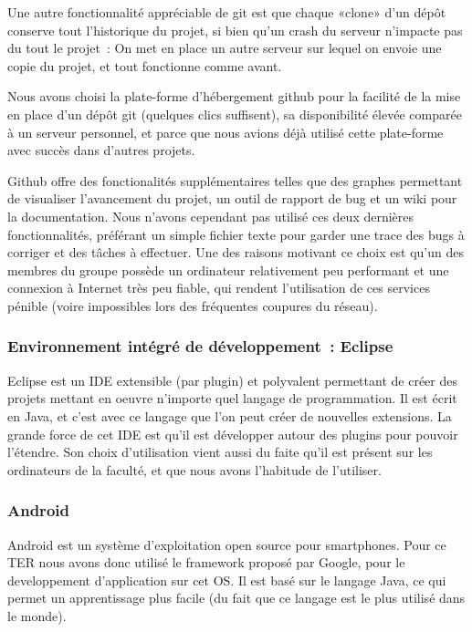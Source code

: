 \documentclass[a4paper,11pt,french]{article}
\def\android{Android\texttrademark{}}
\begin{document}
Une autre fonctionnalité appréciable de git est que chaque «clone» d'un dépôt conserve tout l'historique du projet, si bien qu'un crash du serveur n'impacte pas du tout le projet~: On met en place un autre serveur sur lequel on envoie une copie du projet, et tout fonctionne comme avant.

Nous avons choisi la plate-forme d'hébergement github pour la facilité de la mise en place d'un dépôt git (quelques clics suffisent), sa disponibilité élevée comparée à un serveur personnel, et parce que nous avions déjà utilisé cette plate-forme avec succès dans d'autres projets.

Github offre des fonctionalités supplémentaires telles que des graphes permettant de visualiser l'avancement du projet, un outil de rapport de bug et un wiki pour la documentation. Nous n'avons cependant pas utilisé ces deux dernières fonctionnalités, préférant un simple fichier texte pour garder une trace des bugs à corriger et des tâches à effectuer. Une des raisons motivant ce choix est qu'un des membres du groupe possède un ordinateur relativement peu performant et une connexion à Internet très peu fiable, qui rendent l'utilisation de ces services pénible (voire impossibles lors des fréquentes coupures du réseau).

\subsubsection{Environnement intégré de développement~: Eclipse}
Eclipse est un IDE extensible (par plugin) et polyvalent permettant de créer des projets mettant en oeuvre n'importe quel langage de programmation. Il est écrit en Java, et c'est avec ce langage que l'on peut créer de nouvelles extensions. La grande force de cet IDE est qu'il est développer autour des plugins pour pouvoir l'étendre.
Son choix d'utilisation vient aussi du faite qu'il est présent sur les ordinateurs de la faculté, et que nous avons l'habitude de l'utiliser.

\subsubsection{\android{}}
\android{} est un système d'exploitation open source pour smartphones. Pour ce TER nous avons donc utilisé le framework proposé par Google, pour le developpement d'application sur cet OS. Il est basé sur le langage Java, ce qui permet un apprentissage plus facile (du fait que ce langage est le plus utilisé dans le monde).
\end{document}
